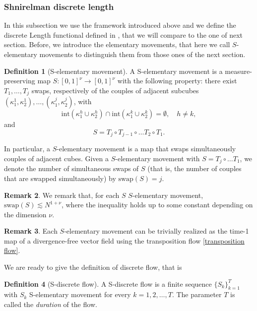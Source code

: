 \documentclass[12 pt]{article}
\theoremstyle{definition} \newtheorem{definition}{Definition}[section]
\theoremstyle{definition} \newtheorem{remark}[definition]{Remark}
\theoremstyle{plain} \newtheorem{lemma}[definition]{Lemma}
\theoremstyle{plain} \newtheorem{proposition}[definition]{Proposition}
\theoremstyle{plain} \newtheorem{theorem}[definition]{Theorem}
\theoremstyle{plain} \newtheorem{corollary}[definition]{Corollary}
\theoremstyle{definition} \newtheorem{example}[definition]{Example}
\theoremstyle{definition} \newtheorem{assumption}[definition]{Assumption}
\theoremstyle{definition} \newtheorem{conjecture}[definition]{Conjecture}
\newcommand{\1}{\mathbbm 1}
\numberwithin{equation}{section}
\begin{document}
\subsubsection{Shnirelman discrete length}\label{SS:Shnirlm:discrete:action}
In this subsection we use the framework introduced above and we define the discrete Length functional defined in  \cite{Shnirelman}, that we will compare to the one of next section. Before, we introduce the elementary movements, that here we call $S$-elementary movements to distinguish them from those ones of the next section.
\begin{definition}[S-elementary movement]\label{def:S:movement}
    A S-elementary movement is a measure-preserving map $S:[0,1]^\nu\rightarrow[0,1]^\nu$ with the following property: there exist $T_1,\dots,T_j$ swaps, respectively of the  couples of adjacent subcubes $(\kappa^1_1,\kappa^1_2),\dots,(\kappa^j_1,\kappa^j_2)$, with 
    \begin{equation*}
        \text{int}(\kappa^h_1\cup \kappa^h_2)\cap\text{int}(\kappa^k_1\cup \kappa^k_2)=\emptyset, \quad h\not =k,
    \end{equation*}
    and 
    \begin{equation*}
        S=T_j\circ T_{j-1}\circ\dots T_2\circ T_1.
    \end{equation*}
   
\end{definition}
In particular, a $S$-elementary movement is a map that swaps simultaneously couples of adjacent cubes.  Given a $S$-elementary movement with $S=T_j\circ\dots T_1$, we denote the number of simultaneous swaps of $S$ (that is, the number of couples that are swapped simultaneously) by $\text{swap}(S)=j$.
\begin{remark}
    We remark that, for each $S$ $S$-elementary movement, $\text{swap}(S)\lesssim N^{1+\nu}$, where the inequality holds up to some constant depending on the dimension $\nu$.
\end{remark}
\begin{remark}
    Each $S$-elementary movement can be trivially realized as the time-1 map of a divergence-free vector field using the transposition flow \eqref{transposition flow}. 
\end{remark}
We are ready to give the definition of discrete flow, that is
\begin{definition}[S-discrete flow]\label{def:S:flow}
    A S-discrete flow is a finite sequence $\lbrace S_k\rbrace _{k=1}^T $ with $S_k$ S-elementary movement for every $k=1,2,\dots,T$. The parameter $T$ is called the \emph{duration} of the flow.
\end{definition}
\end{document}
